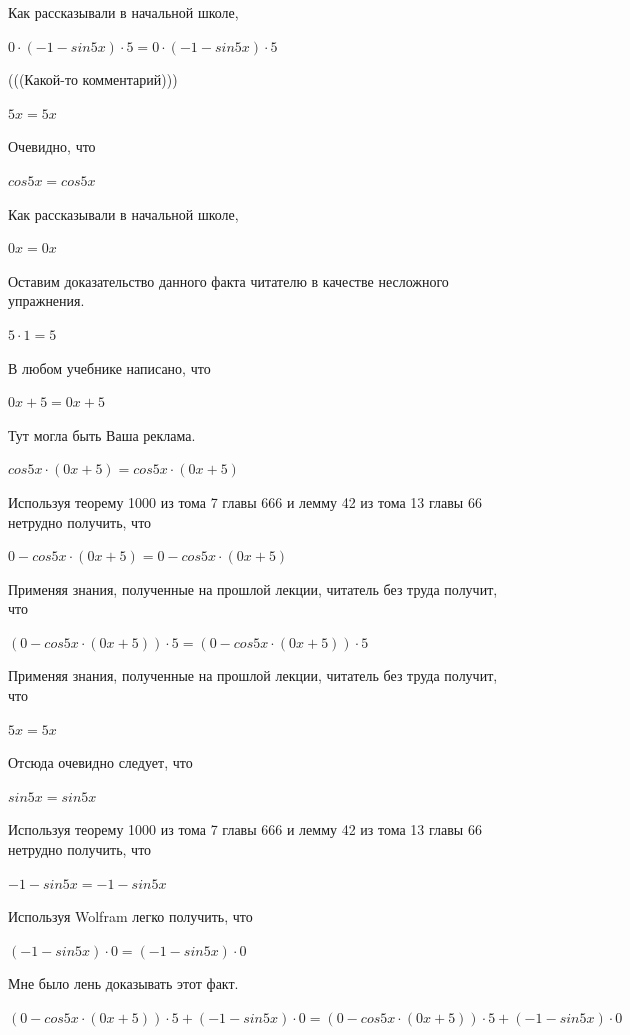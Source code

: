 \documentclass[12pt,a4paper,fleqn]{article}
\theoremstyle{definition}
\begin{document}
Как рассказывали в начальной школе, 

$ 0  \cdot ( -1  - sin 5  x ) \cdot  5  =  0  \cdot ( -1  - sin 5  x ) \cdot  5 $

(((Какой-то комментарий))) 

$ 5  x  =  5  x $

Очевидно, что 

$cos 5  x  = cos 5  x $

Как рассказывали в начальной школе, 

$ 0  x  =  0  x $

Оставим доказательство данного факта читателю в качестве несложного упражнения. 

$ 5  \cdot  1  =  5 $

В любом учебнике написано, что 

$ 0  x  +  5  =  0  x  +  5 $

Тут могла быть Ваша реклама. 

$cos 5  x  \cdot ( 0  x  +  5 ) = cos 5  x  \cdot ( 0  x  +  5 )$

Используя теорему 1000 из тома 7 главы 666 и лемму 42 из тома 13 главы 66 нетрудно получить, что 

$ 0  - cos 5  x  \cdot ( 0  x  +  5 ) =  0  - cos 5  x  \cdot ( 0  x  +  5 )$

Применяя знания, полученные на прошлой лекции, читатель без труда получит, что 

$( 0  - cos 5  x  \cdot ( 0  x  +  5 )) \cdot  5  = ( 0  - cos 5  x  \cdot ( 0  x  +  5 )) \cdot  5 $

Применяя знания, полученные на прошлой лекции, читатель без труда получит, что 

$ 5  x  =  5  x $

Отсюда очевидно следует, что 

$sin 5  x  = sin 5  x $

Используя теорему 1000 из тома 7 главы 666 и лемму 42 из тома 13 главы 66 нетрудно получить, что 

$ -1  - sin 5  x  =  -1  - sin 5  x $

Используя Wolfram легко получить, что 

$( -1  - sin 5  x ) \cdot  0  = ( -1  - sin 5  x ) \cdot  0 $

Мне было лень доказывать этот факт.

$( 0  - cos 5  x  \cdot ( 0  x  +  5 )) \cdot  5  + ( -1  - sin 5  x ) \cdot  0  = ( 0  - cos 5  x  \cdot ( 0  x  +  5 )) \cdot  5  + ( -1  - sin 5  x ) \cdot  0 $
\end{document}
